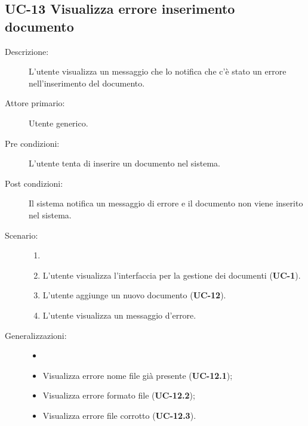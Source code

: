 \subsection{UC-13 Visualizza errore inserimento documento}
\begin{description}
    \item[Descrizione:] L'utente visualizza un messaggio che lo notifica che c'è stato un errore nell'inserimento del documento.
    \item[Attore primario:] Utente generico.
    \item[Pre condizioni:] L'utente tenta di inserire un documento nel sistema.
    \item[Post condizioni:] Il sistema notifica un messaggio di errore e il documento non viene inserito nel sistema.
    \item[Scenario:]
    \begin{enumerate}
        \item[] 
        \item L’utente visualizza l'interfaccia per la gestione dei documenti (\textbf{UC-1}).
        \item L’utente aggiunge un nuovo documento (\textbf{UC-12}).
        \item L'utente visualizza un messaggio d'errore.
    \end{enumerate}
    \item[Generalizzazioni:]
    \begin{itemize}
        \item[] 
        \item Visualizza errore nome file già presente (\textbf{UC-12.1});
        \item Visualizza errore formato file (\textbf{UC-12.2});
        \item Visualizza errore file corrotto (\textbf{UC-12.3}).
    \end{itemize}
\end{description}

